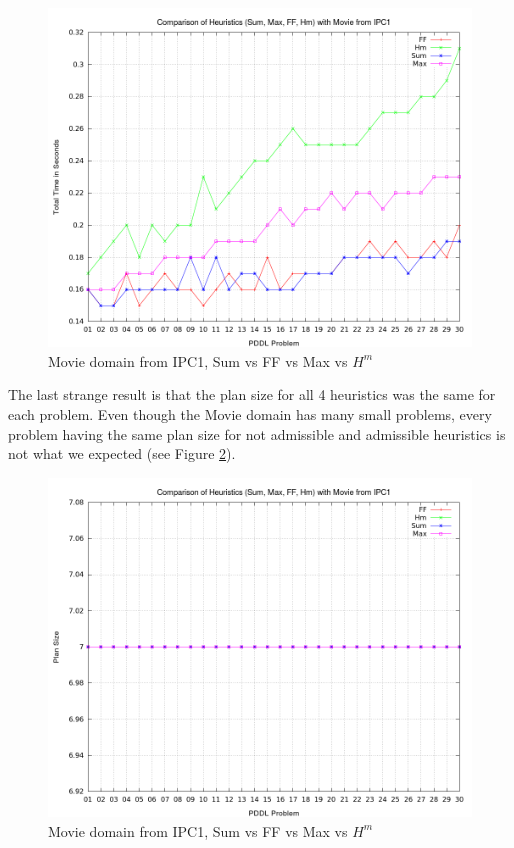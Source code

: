 \begin{figure}[!htb]
    \centering
    \includegraphics[scale=0.35]{MovieTotalTime.png}
    \caption{Movie domain from IPC1, Sum vs FF vs Max vs $H^m$}
    \label{fig:MovieTotalTimeHeuristics}
\end{figure}
The last strange result is that the plan size for all 4 heuristics was the same for each problem. Even though the Movie domain has many small problems, every problem having the same plan size for not admissible and admissible heuristics is not what we expected (see Figure \ref{fig:MoviePlanSize}). 
\begin{figure}[!htb]
    \centering
    \includegraphics[scale=0.35]{MoviePlanSize.png}
    \caption{Movie domain from IPC1, Sum vs FF vs Max vs $H^m$}
    \label{fig:MoviePlanSize}
\end{figure}
